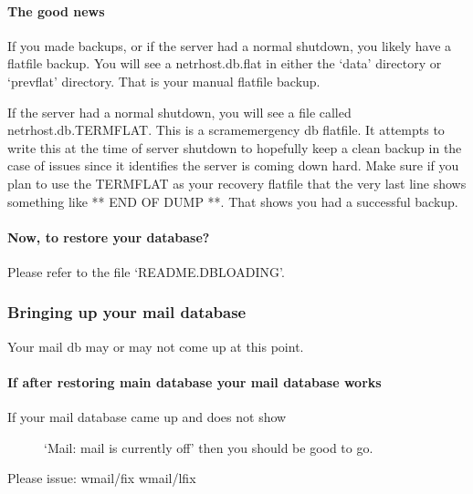 \documentclass[letterpaper,10pt,english]{sphinxmanual}
\begin{document}
\paragraph{The good news}
\label{\detokenize{troubleshooting:the-good-news}}
\sphinxAtStartPar
If you made backups, or if the server had a normal shutdown, you
likely have a flatfile backup.  You will see a netrhost.db.flat
in either the ‘data’ directory or ‘prevflat’ directory.  That
is your manual flatfile backup.

\sphinxAtStartPar
If the server had a normal shutdown, you will see a file called
netrhost.db.TERMFLAT.  This is a scram\sphinxhyphen{}emergency db flatfile.
It attempts to write this at the time of server shutdown to
hopefully keep a clean backup in the case of issues since
it identifies the server is coming down hard.  Make sure
if you plan to use the TERMFLAT as your recovery flatfile
that the very last line shows something like ** END OF DUMP **.
That shows you had a successful backup.


\paragraph{Now, to restore your database?}
\label{\detokenize{troubleshooting:now-to-restore-your-database}}
\sphinxAtStartPar
Please refer to the file ‘README.DBLOADING’.


\subsubsection{Bringing up your mail database}
\label{\detokenize{troubleshooting:bringing-up-your-mail-database}}
\sphinxAtStartPar
Your mail db may or may not come up at this point.


\paragraph{If after restoring main database your mail database works}
\label{\detokenize{troubleshooting:if-after-restoring-main-database-your-mail-database-works}}\begin{description}
\item[{If your mail database came up and does not show}] \leavevmode
\sphinxAtStartPar
‘Mail: mail is currently off’ then you should be good to go.

\end{description}

\sphinxAtStartPar
Please issue:
wmail/fix
wmail/lfix
\end{document}
